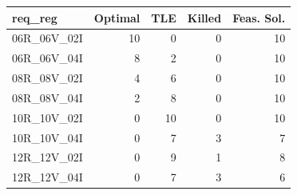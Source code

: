 
\begin{tabular}{lrrrr}
\toprule
req\_reg & Optimal & TLE & Killed & Feas. Sol.\\
\midrule
06R\_06V\_02I & 10 & 0 & 0 & 10\\
06R\_06V\_04I & 8 & 2 & 0 & 10\\
08R\_08V\_02I & 4 & 6 & 0 & 10\\
08R\_08V\_04I & 2 & 8 & 0 & 10\\
10R\_10V\_02I & 0 & 10 & 0 & 10\\
\addlinespace
10R\_10V\_04I & 0 & 7 & 3 & 7\\
12R\_12V\_02I & 0 & 9 & 1 & 8\\
12R\_12V\_04I & 0 & 7 & 3 & 6\\
\bottomrule
\end{tabular}
